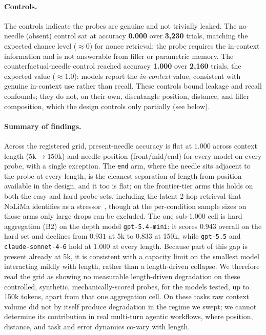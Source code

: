 \documentclass[11pt]{article}
\begin{document}
\paragraph{Controls.}
The controls indicate the probes are genuine and not trivially leaked. The
no-needle (absent) control sat at accuracy \textbf{0.000} over \textbf{3{,}230}
trials, matching the expected chance level ($\approx 0$) for nonce retrieval:
the probe requires the in-context information and is not answerable from filler
or parametric memory. The counterfactual-needle control reached accuracy
\textbf{1.000} over \textbf{2{,}160} trials, the expected value
($\approx 1.0$): models report the \emph{in-context} value, consistent with
genuine in-context use rather than recall. These controls bound leakage and
recall confounds; they do not, on their own, disentangle position, distance,
and filler composition, which the design controls only partially (see below).

\paragraph{Summary of findings.}
Across the registered grid, present-needle accuracy is flat at $1.000$ across
context length ($5\text{k}\!\to\!150\text{k}$) and needle position
(front/mid/end) for every model on every probe, with a single exception. The
\texttt{end} arm, where the needle sits adjacent to the probe at every length,
is the cleanest separation of length from position available in the design, and
it too is flat; on the frontier-tier arms this holds on both the easy and hard
probe sets, including the latent 2-hop retrieval that NoLiMa identifies as a
stressor~\cite{modarressi2025nolima}, though at the per-condition sample sizes
on those arms only large drops can be excluded. The one sub-$1.000$ cell is
hard aggregation (B2) on the depth model \texttt{gpt-5.4-mini}: it scores
$0.943$ overall on the hard set and declines from $0.931$ at 5k to $0.833$ at
150k, while \texttt{gpt-5.5} and \texttt{claude-sonnet-4-6} hold at $1.000$ at
every length. Because part of this gap is present already at 5k, it is
consistent with a capacity limit on the smallest model interacting mildly with
length, rather than a length-driven collapse. We therefore read the grid as
showing no measurable length-driven degradation on these controlled, synthetic,
mechanically-scored probes, for the models tested, up to 150k tokens, apart
from that one aggregation cell. On these tasks raw context volume did not by
itself produce degradation in the regime we swept; we cannot determine its
contribution in real multi-turn agentic workflows, where position, distance,
and task and error dynamics co-vary with length.
\end{document}
